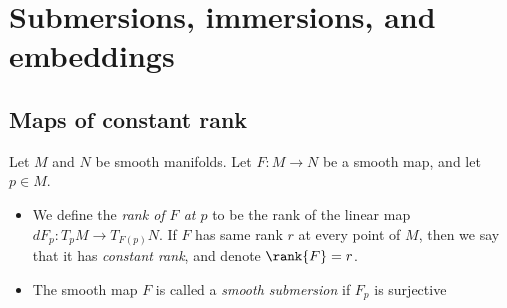 
\chapter{Submersions, immersions, and embeddings}

\section{Maps of constant rank}

\begin{definition}
    Let $M$ and $N$ be smooth manifolds. Let $F : M \to N$ be a smooth map, and let $p \in M$.
    \begin{itemize}
        \item We define the \emph{rank of $F$ at $p$} to be the rank of the linear map $dF_p : T_pM \to T_{F(p)}N$. If $F$ has same rank $r$ at every point of $M$, then we say that it has \emph{constant rank}, and denote $\rank{F} = r$.
        \item The smooth map $F$ is called a \emph{smooth submersion} if $F_p$ is surjective 
    \end{itemize}
\end{definition}
